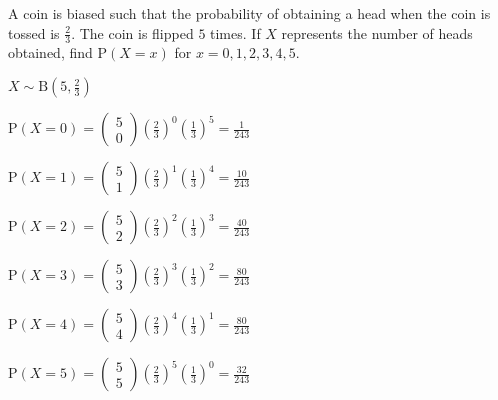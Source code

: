 \documentclass[11pt,a4paper]{book}
\begin{document}
\newpage

\begin{example}

A coin is biased such that the probability of obtaining a head when
the coin is tossed is ${\displaystyle \frac{2}{3}}$. The coin is
flipped $5$ times. If $X$ represents the number of heads obtained,
find $\text{P}\left(X=x\right)$ for $x=0,1,2,3,4,5$.

\Solution

${\displaystyle X\sim\text{B}\left(5,\frac{2}{3}\right)}$

\begin{minipage}[t]{.5\textwidth}

${\displaystyle \text{P}\left(X=0\right)=\begin{pmatrix}5\\
0
\end{pmatrix}\left(\frac{2}{3}\right)^{0}\left(\frac{1}{3}\right)^{5}=\frac{1}{243}}$

${\displaystyle \text{P}\left(X=1\right)=\begin{pmatrix}5\\
1
\end{pmatrix}\left(\frac{2}{3}\right)^{1}\left(\frac{1}{3}\right)^{4}=\frac{10}{243}}$

${\displaystyle \text{P}\left(X=2\right)=\begin{pmatrix}5\\
2
\end{pmatrix}\left(\frac{2}{3}\right)^{2}\left(\frac{1}{3}\right)^{3}=\frac{40}{243}}$

\end{minipage}
\begin{minipage}[t]{.5\textwidth}

${\displaystyle \text{P}\left(X=3\right)=\begin{pmatrix}5\\
3
\end{pmatrix}\left(\frac{2}{3}\right)^{3}\left(\frac{1}{3}\right)^{2}=\frac{80}{243}}$

${\displaystyle \text{P}\left(X=4\right)=\begin{pmatrix}5\\
4
\end{pmatrix}\left(\frac{2}{3}\right)^{4}\left(\frac{1}{3}\right)^{1}=\frac{80}{243}}$

${\displaystyle \text{P}\left(X=5\right)=\begin{pmatrix}5\\
5
\end{pmatrix}\left(\frac{2}{3}\right)^{5}\left(\frac{1}{3}\right)^{0}=\frac{32}{243}}$

\end{minipage}

\end{example}
\end{document}
